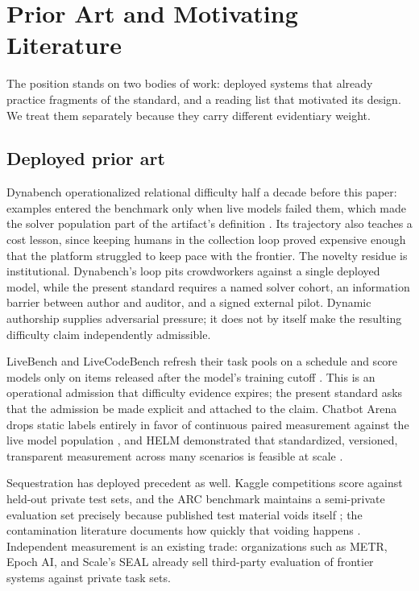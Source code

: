 \documentclass[11pt]{article}
\begin{document}
\section{Prior Art and Motivating Literature}
\label{sec:evidence}

The position stands on two bodies of work: deployed systems that already practice fragments of the standard, and a reading list that motivated its design. We treat them separately because they carry different evidentiary weight.

\subsection{Deployed prior art}

Dynabench operationalized relational difficulty half a decade before this paper: examples entered the benchmark only when live models failed them, which made the solver population part of the artifact's definition \citep{kiela2021dynabench}. Its trajectory also teaches a cost lesson, since keeping humans in the collection loop proved expensive enough that the platform struggled to keep pace with the frontier. The novelty residue is institutional. Dynabench's loop pits crowdworkers against a single deployed model, while the present standard requires a named solver cohort, an information barrier between author and auditor, and a signed external pilot. Dynamic authorship supplies adversarial pressure; it does not by itself make the resulting difficulty claim independently admissible.

LiveBench and LiveCodeBench refresh their task pools on a schedule and score models only on items released after the model's training cutoff \citep{white2024livebench, jain2024livecodebench}. This is an operational admission that difficulty evidence expires; the present standard asks that the admission be made explicit and attached to the claim. Chatbot Arena drops static labels entirely in favor of continuous paired measurement against the live model population \citep{chiang2024arena}, and HELM demonstrated that standardized, versioned, transparent measurement across many scenarios is feasible at scale \citep{liang2022helm}.

Sequestration has deployed precedent as well. Kaggle competitions score against held-out private test sets, and the ARC benchmark maintains a semi-private evaluation set precisely because published test material voids itself \citep{chollet2019measure}; the contamination literature documents how quickly that voiding happens \citep{sainz2023contamination}. Independent measurement is an existing trade: organizations such as METR, Epoch AI, and Scale's SEAL already sell third-party evaluation of frontier systems against private task sets.
\end{document}
